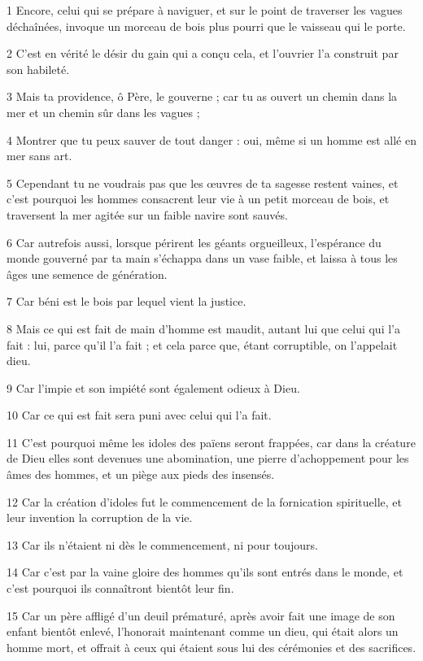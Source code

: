 \par 1 Encore, celui qui se prépare à naviguer, et sur le point de traverser les vagues déchaînées, invoque un morceau de bois plus pourri que le vaisseau qui le porte.
\par 2 C'est en vérité le désir du gain qui a conçu cela, et l'ouvrier l'a construit par son habileté.
\par 3 Mais ta providence, ô Père, le gouverne ; car tu as ouvert un chemin dans la mer et un chemin sûr dans les vagues ;
\par 4 Montrer que tu peux sauver de tout danger : oui, même si un homme est allé en mer sans art.
\par 5 Cependant tu ne voudrais pas que les œuvres de ta sagesse restent vaines, et c'est pourquoi les hommes consacrent leur vie à un petit morceau de bois, et traversent la mer agitée sur un faible navire sont sauvés.
\par 6 Car autrefois aussi, lorsque périrent les géants orgueilleux, l'espérance du monde gouverné par ta main s'échappa dans un vase faible, et laissa à tous les âges une semence de génération.
\par 7 Car béni est le bois par lequel vient la justice.
\par 8 Mais ce qui est fait de main d'homme est maudit, autant lui que celui qui l'a fait : lui, parce qu'il l'a fait ; et cela parce que, étant corruptible, on l'appelait dieu.
\par 9 Car l'impie et son impiété sont également odieux à Dieu.
\par 10 Car ce qui est fait sera puni avec celui qui l'a fait.
\par 11 C'est pourquoi même les idoles des païens seront frappées, car dans la créature de Dieu elles sont devenues une abomination, une pierre d'achoppement pour les âmes des hommes, et un piège aux pieds des insensés.
\par 12 Car la création d'idoles fut le commencement de la fornication spirituelle, et leur invention la corruption de la vie.
\par 13 Car ils n'étaient ni dès le commencement, ni pour toujours.
\par 14 Car c'est par la vaine gloire des hommes qu'ils sont entrés dans le monde, et c'est pourquoi ils connaîtront bientôt leur fin.
\par 15 Car un père affligé d'un deuil prématuré, après avoir fait une image de son enfant bientôt enlevé, l'honorait maintenant comme un dieu, qui était alors un homme mort, et offrait à ceux qui étaient sous lui des cérémonies et des sacrifices.

